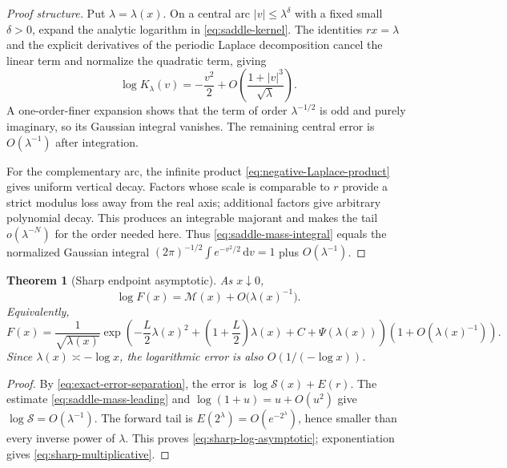 \documentclass[11pt,oneside]{article}
\newtheorem{theorem}{Theorem}[section]
\theoremstyle{definition}
\theoremstyle{remark}
\newcommand{\dd}{\,\mathrm d}
\newcommand{\Lam}{\lambda}
\newcommand{\Ltwo}{L}
\newcommand{\PsiPer}{\Psi}
\begin{document}
\begin{proof}[Proof structure]
Put $\Lam=\Lam(x)$.  On a central arc
$|v|\le\Lam^{\delta}$ with a fixed small $\delta>0$, expand the analytic logarithm
in \eqref{eq:saddle-kernel}.  The identities $rx=\Lam$ and the explicit derivatives
of the periodic Laplace decomposition cancel the linear term and normalize the
quadratic term, giving
\begin{equation}\label{eq:kernel-leading-expansion}
  \log K_\Lam(v)=-\frac{v^2}{2}
  +O\left(\frac{1+|v|^3}{\sqrt\Lam}\right).
\end{equation}
A one-order-finer expansion shows that the term of order $\Lam^{-1/2}$ is odd and
purely imaginary, so its Gaussian integral vanishes.  The remaining central error
is $O(\Lam^{-1})$ after integration.

For the complementary arc, the infinite product
\eqref{eq:negative-Laplace-product} gives uniform vertical decay.  Factors whose
scale is comparable to $r$ provide a strict modulus loss away from the real axis;
additional factors give arbitrary polynomial decay.  This produces an integrable
majorant and makes the tail $o(\Lam^{-N})$ for the order needed here.  Thus
\eqref{eq:saddle-mass-integral} equals the normalized Gaussian integral
$(2\pi)^{-1/2}\int e^{-v^2/2}\dd v=1$ plus $O(\Lam^{-1})$.
\end{proof}

\begin{theorem}[Sharp endpoint asymptotic]\label{thm:sharp-asymptotic}
As $x\downarrow0$,
\begin{equation}\label{eq:sharp-log-asymptotic}
  \log F(x)=\mathcal M(x)+O\bigl(\Lam(x)^{-1}\bigr).
\end{equation}
Equivalently,
\begin{equation}\label{eq:sharp-multiplicative}
 F(x)=\frac{1}{\sqrt{\Lam(x)}}
 \exp\left(
 -\frac{\Ltwo}{2}\Lam(x)^2
 +\left(1+\frac{\Ltwo}{2}\right)\Lam(x)
 +C+\PsiPer(\Lam(x))
 \right)
 \left(1+O(\Lam(x)^{-1})\right).
\end{equation}
Since $\Lam(x)\asymp-\log x$, the logarithmic error is also
$O(1/(-\log x))$.
\end{theorem}

\begin{proof}
By \eqref{eq:exact-error-separation}, the error is
$\log\mathcal S(x)+E(r)$.  The estimate
\eqref{eq:saddle-mass-leading} and $\log(1+u)=u+O(u^2)$ give
$\log\mathcal S=O(\Lam^{-1})$.  The forward tail is
$E(2^\Lam)=O(e^{-2^\Lam})$, hence smaller than every inverse power of $\Lam$.
This proves \eqref{eq:sharp-log-asymptotic}; exponentiation gives
\eqref{eq:sharp-multiplicative}.
\end{proof}
\end{document}
